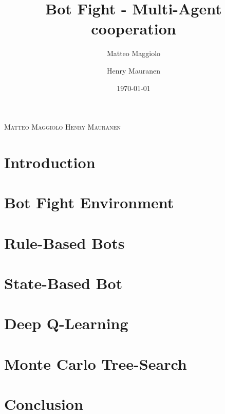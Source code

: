\documentclass{article}
\title{Bot Fight - Multi-Agent cooperation}
\author{Matteo Maggiolo \and Henry Mauranen}
\date{\today}
\begin{document}
	
	\makeatletter
	\begin{center}
		{\scshape\LARGE{\@title}\par}
		{\scshape\normalsize Matteo Maggiolo \hspace{2cm} Henry Mauranen \par}
		{\scshape\normalsize\@date\par}
	\end{center}
	\makeatother
	
	\section{Introduction}
	
	\section{Bot Fight Environment}
	
	\section{Rule-Based Bots}
	
	\section{State-Based Bot}
	
	\section{Deep Q-Learning}
	
	\section{Monte Carlo Tree-Search}
	
	\section{Conclusion}
	
\end{document}
